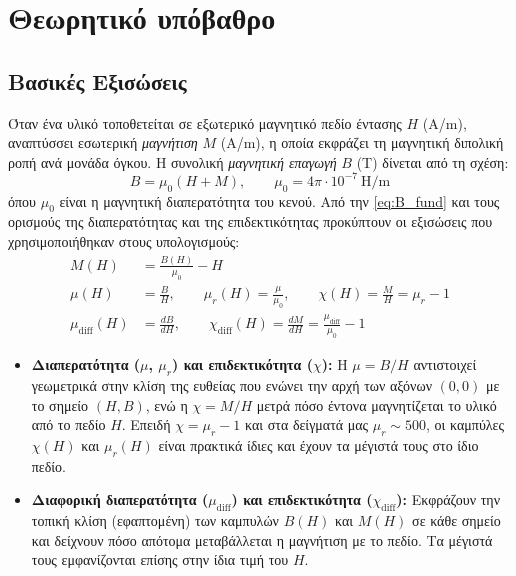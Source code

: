 \documentclass[11pt,a4paper]{article}
\newcommand{\diff}{\mathrm{diff}}
\begin{document}
\section{Θεωρητικό υπόβαθρο}

\subsection{Βασικές Εξισώσεις}
Όταν ένα υλικό τοποθετείται σε εξωτερικό μαγνητικό πεδίο έντασης $H$ (\textlatin{A/m}), αναπτύσσει εσωτερική \emph{μαγνήτιση} $M$ (\textlatin{A/m}), η οποία εκφράζει τη μαγνητική διπολική ροπή ανά μονάδα όγκου. Η συνολική \emph{μαγνητική επαγωγή} $B$ (\textlatin{T}) δίνεται από τη σχέση:
\begin{equation}
 B = \mu_0 (H + M), \qquad \mu_0 = 4\pi \cdot 10^{-7}\ \mathrm{H/m} \label{eq:B_fund}
\end{equation}
όπου $\mu_0$ είναι η μαγνητική διαπερατότητα του κενού. Από την \eqref{eq:B_fund} και τους ορισμούς της διαπερατότητας και της επιδεκτικότητας προκύπτουν οι εξισώσεις που χρησιμοποιήθηκαν στους υπολογισμούς:
\begin{align}
 M(H) &= \frac{B(H)}{\mu_0} - H \label{eq:M}\\
 \mu(H) &= \frac{B}{H}, \qquad \mu_r(H) = \frac{\mu}{\mu_0}, \qquad \chi(H) = \frac{M}{H} = \mu_r - 1 \label{eq:mu}\\
 \mu_{\diff}(H) &= \frac{dB}{dH}, \qquad \chi_{\diff}(H) = \frac{dM}{dH} = \frac{\mu_{\diff}}{\mu_0} - 1 \label{eq:diff}
\end{align}

\begin{itemize}[nosep]
 \item \textbf{Διαπερατότητα ($\mu$, $\mu_r$) και επιδεκτικότητα ($\chi$):} Η $\mu = B/H$ αντιστοιχεί γεωμετρικά στην κλίση της ευθείας που ενώνει την αρχή των αξόνων $(0,0)$ με το σημείο $(H,B)$, ενώ η $\chi = M/H$ μετρά πόσο έντονα μαγνητίζεται το υλικό από το πεδίο $H$. Επειδή $\chi = \mu_r - 1$ και στα δείγματά μας $\mu_r \sim 500$, οι καμπύλες $\chi(H)$ και $\mu_r(H)$ είναι πρακτικά ίδιες και έχουν τα μέγιστά τους στο ίδιο πεδίο.
 \item \textbf{Διαφορική διαπερατότητα ($\mu_{\diff}$) και επιδεκτικότητα ($\chi_{\diff}$):} Εκφράζουν την τοπική κλίση (εφαπτομένη) των καμπυλών $B(H)$ και $M(H)$ σε κάθε σημείο και δείχνουν πόσο απότομα μεταβάλλεται η μαγνήτιση με το πεδίο. Τα μέγιστά τους εμφανίζονται επίσης στην ίδια τιμή του $H$.
\end{itemize}
\end{document}
